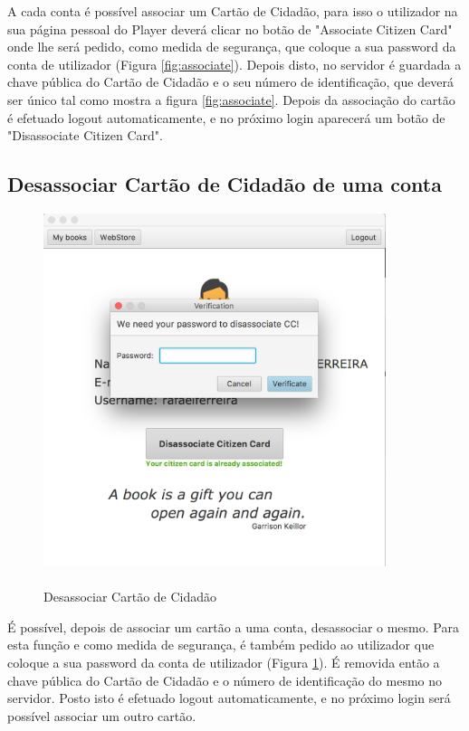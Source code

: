 \documentclass[pdftex,12pt,a4paper]{report}
\begin{document}
A cada conta é possível associar um Cartão de Cidadão, para isso o utilizador na sua página pessoal do Player deverá clicar no botão de "Associate Citizen Card" onde lhe será pedido, como medida de segurança, que coloque a sua password da conta de utilizador (Figura \ref{fig:associate}). Depois disto, no servidor é guardada a chave pública do Cartão de Cidadão e o seu número de identificação, que deverá ser único tal como mostra a figura \ref{fig:associate}. Depois da associação do cartão é efetuado logout automaticamente, e no próximo login aparecerá um botão de "Disassociate Citizen Card".


\newpage
\subsection{Desassociar Cartão de Cidadão de uma conta}

\begin{figure}[!htb]
\center
 \includegraphics[width=100mm,scale=1]{Disassociate.png}
 \caption{\\Desassociar Cartão de Cidadão}
 \label{fig:disassociate}
\end{figure}

É possível, depois de associar um cartão a uma conta, desassociar o mesmo. Para esta função e como medida de segurança, é também pedido ao utilizador que coloque a sua password da conta de utilizador (Figura \ref{fig:disassociate}). É removida então a chave pública do Cartão de Cidadão e o número de identificação do mesmo no servidor. Posto isto é efetuado logout automaticamente, e no próximo login será possível associar um outro cartão.
\end{document}

